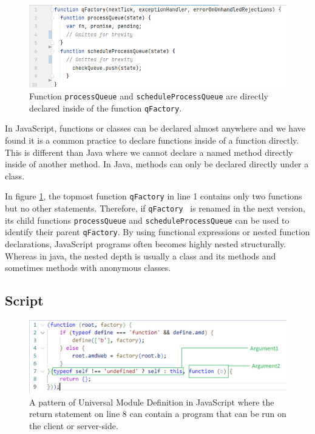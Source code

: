 \documentclass[letterpaper,12pt,onecolumn,final]{report}
\begin{document}
\begin{figure}
\includegraphics[width=\textwidth,height=\textheight,keepaspectratio]{images/nested_FDs.png}
  \caption{Function \texttt{processQueue} and \texttt{scheduleProcessQueue} are directly declared inside of the function \texttt{qFactory}. }
   \label{fig:nestedFds}
\end{figure} 

In JavaScript, functions or classes can be declared almost anywhere and we have found it is a common practice to declare functions inside of a function directly. This is different than Java where we cannot declare a named method directly inside of another method. In Java, methods can only be declared directly under a class.

In figure \ref{fig:nestedFds}, the topmost function \texttt{qFactory} in line 1 contains only two functions but no other statements. Therefore, if \texttt{qFactory}  is renamed in the next version, its child functions \texttt{processQueue} and \texttt{scheduleProcessQueue} can be used to identify their parent \texttt{qFactory}. By using functional expressions or nested function declarations, JavaScript programs often becomes highly nested structurally. Whereas in java, the nested depth is usually a class and its methods and sometimes methods with anonymous classes.

\subsection {Script}

\begin{figure}
\includegraphics[width=\textwidth,height=\textheight,keepaspectratio]{images/umd.png}
  \caption{A pattern of Universal Module Definition in JavaScript where the return statement on line 8 can contain a program that can be run on the client or server-side. }
   \label{fig:umd}
\end{figure} 
\end{document}
